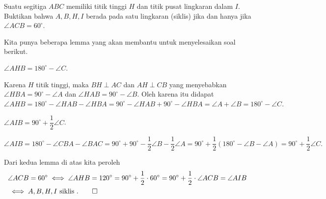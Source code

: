 \documentclass[12pt]{scrartcl}
\begin{document}
	\begin{soalbaru} 
		Suatu segitiga $ABC$ memiliki titik tinggi $H$ dan titik pusat lingkaran dalam $I$. Buktikan bahwa $A,B,H,I$ berada pada satu lingkaran (siklis) jika dan hanya jika $\angle ACB = 60^\circ$.\\[-10pt]
		\begin{solusi}
		Kita punya beberapa lemma yang akan membantu untuk menyelesaikan soal berikut.
		\begin{lemmarev}
		$\angle AHB = 180^\circ - \angle C$.
		
		\begin{buktilemma}
		Karena $H$ titik tinggi, maka $BH \perp AC$ dan $AH \perp CB$ yang menyebabkan $\angle HBA = 90^\circ  -\angle A$ dan $\angle HAB = 90^\circ - \angle B$. Oleh karena itu didapat $\angle AHB = 180^\circ - \angle HAB - \angle HBA = 90^\circ - \angle HAB + 90^\circ - \angle HBA = \angle A + \angle B = 180^\circ - \angle C.$
		\end{buktilemma}
		\end{lemmarev}
		
		\begin{lemmarev}
		$\angle AIB = 90^\circ + \dfrac{1}{2}\angle C$.
		\begin{buktilemma}
		$\angle AIB = 180^\circ - \angle CBA - \angle BAC = 90^\circ + 90^\circ - \dfrac{1}{2}\angle B - \dfrac{1}{2}\angle A = 90^\circ + \dfrac{1}{2}(180^\circ-\angle B-\angle A)=90^\circ+\dfrac{1}{2}\angle C.$
		\end{buktilemma}

			
		
		\end{lemmarev}
		
		Dari kedua lemma di atas kita peroleh
		\begin{align*}
				&\angle ACB = 60^\circ \iff \angle AHB = 120^\circ = 90^\circ + \dfrac{1}{2}\cdot 60^\circ = 90^\circ + \dfrac{1}{2}\cdot \angle ACB= \angle AIB\\
				&\iff  A,B,H,I \text{ siklis }. \qed
				\end{align*}
		\end{solusi}
	\end{soalbaru}
\end{document}
